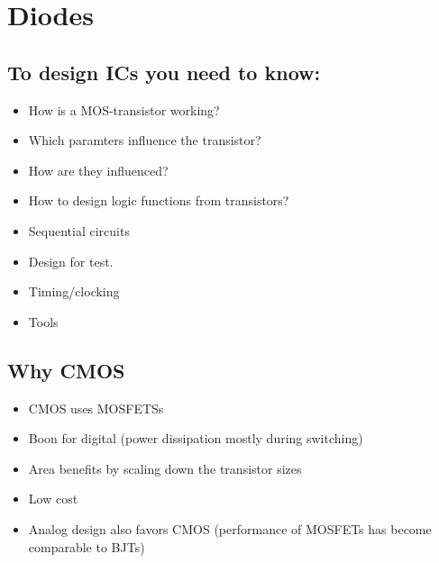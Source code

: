 \documentclass[a4paper,11pt,norsk]{article}
\begin{document}


\section{Diodes}
\subsection{To design ICs you need to know:}
\begin{itemize}
    \item How is a MOS-transistor working?
    \item Which paramters influence the transistor?
    \item How are they influenced?
    \item How to design logic functions from transistors?
    \item Sequential circuits
    \item Design for test.
    \item Timing/clocking
    \item Tools
\end{itemize}

\subsection{Why CMOS}
\begin{itemize}
    \item CMOS uses MOSFETSs
    \item Boon for digital (power dissipation mostly during switching)
    \item Area benefits by scaling down the transistor sizes 
    \item Low cost
    \item Analog design also favors CMOS (performance of MOSFETs has become comparable to BJTs)
\end{itemize}

\subsection{}
\end{document}
